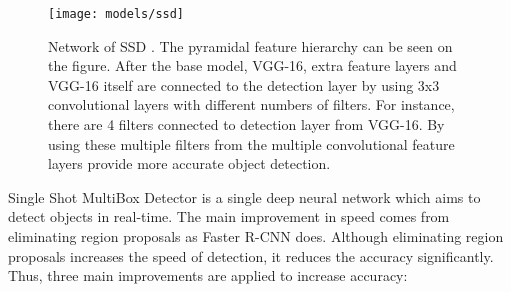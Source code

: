 \documentclass{article}
\begin{document}
\setlength{\parindent}{6ex}

\begin{figure}
    \centering
    \texttt{[image: models/ssd]}
    \caption{Network of SSD \cite{ssdcite}. 
    The pyramidal feature hierarchy can be seen on the figure. After 
    the base model, VGG-16, extra feature layers and VGG-16 itself are 
    connected to the detection layer by using 3x3 convolutional layers 
    with different numbers of filters. For instance, there are 4 filters 
    connected to detection layer from VGG-16. By using these multiple filters 
    from the multiple convolutional feature layers provide more accurate object 
    detection.}
    \label{fig:ssd1}
\end{figure}

\indent

Single Shot MultiBox Detector \cite{ssdcite} is a single deep neural network which aims to detect 
objects in real-time. The main improvement in speed comes from eliminating region 
proposals as Faster R-CNN does. Although eliminating region proposals increases 
the speed of detection, it reduces the accuracy significantly. Thus, three main 
improvements are applied to increase accuracy:
\end{document}
